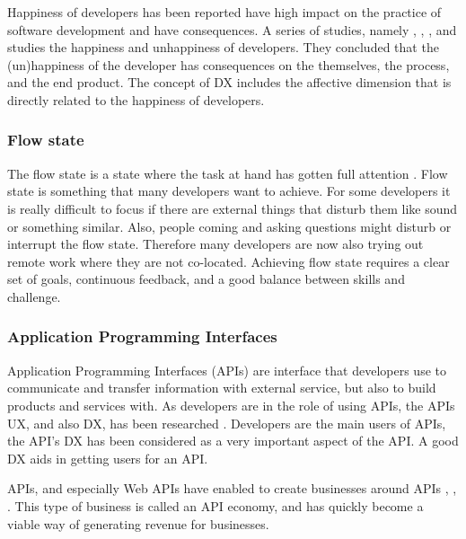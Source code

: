 \documentclass[english, 12pt, a4paper, sci, utf8, a-1b, online]{aaltothesis}
\begin{document}
Happiness of developers has been reported have high impact on the practice of software development and have consequences. A series of studies, namely \textcite{unhappy-developers}, \textcite{on-the-unhappiness}, \textcite{consequences-of-unhappiness}, and \textcite{what-happens-when-unhappy} studies the happiness and unhappiness of developers. They concluded that the (un)happiness of the developer has consequences on the themselves, the process, and the end product. The concept of DX \parencite{fagerholm-dx-concept-and-definition} includes the affective dimension that is directly related to the happiness of developers.

\subsubsection{Flow state}

The flow state is a state where the task at hand has gotten full attention \parencite{flow-intrinsic-dx}. Flow state is something that many developers want to achieve. For some developers it is really difficult to focus if there are external things that disturb them like sound or something similar. Also, people coming and asking questions might disturb or interrupt the flow state. Therefore many developers are now also trying out remote work where they are not co-located. Achieving flow state requires a clear set of goals, continuous feedback, and a good balance between skills and challenge.

\subsubsection{Application Programming Interfaces}

Application Programming Interfaces (APIs) are interface that developers use to communicate and transfer information with external service, but also to build products and services with. As developers are in the role of using APIs, the APIs UX, and also DX, has been researched \parencite{api-designers}. Developers are the main users of APIs, the API's DX has been considered as a very important aspect of the API. A good DX aids in getting users for an API.

APIs, and especially Web APIs have enabled to create businesses around APIs \parencite{api-ecosystem}, \parencite{web-api-economy}, \parencite{moilanen2018api}. This type of business is called an API economy, and has quickly become a viable way of generating revenue for businesses.
\end{document}
